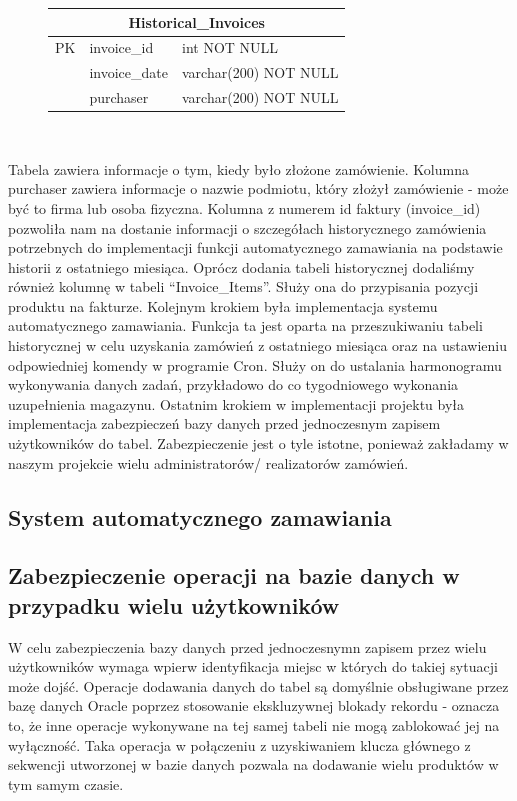 \documentclass{article}
\begin{document}
\begin{figure}[H]
   \centering
   \begin{tabular}{|c|l|l|} \hline
      \multicolumn{3}{|c|}{Historical\_Invoices} \\ \hline
      PK & invoice\_id   & int NOT NULL          \\ \hline
         & invoice\_date & varchar(200) NOT NULL \\
         & purchaser     & varchar(200) NOT NULL \\ \hline
   \end{tabular} \\
\end{figure}
\vspace{0.3cm}
Tabela zawiera informacje o tym, kiedy było złożone zamówienie.
Kolumna purchaser zawiera informacje o nazwie podmiotu, który złożył zamówienie
- może być to firma lub osoba fizyczna. Kolumna z numerem id faktury (invoice\_id) pozwoliła nam na
dostanie informacji o szczegółach historycznego zamówienia potrzebnych do implementacji funkcji
automatycznego zamawiania na podstawie historii z ostatniego miesiąca. Oprócz dodania tabeli
historycznej dodaliśmy również kolumnę w tabeli ``Invoice\_Items''. Służy ona do przypisania pozycji
produktu na fakturze. Kolejnym krokiem była implementacja systemu automatycznego zamawiania. Funkcja ta jest oparta na przeszukiwaniu tabeli
historycznej w celu uzyskania zamówień z ostatniego miesiąca oraz na ustawieniu odpowiedniej komendy
w programie Cron. Służy on do ustalania harmonogramu wykonywania danych zadań, przykładowo do
co tygodniowego wykonania uzupełnienia magazynu. Ostatnim krokiem w implementacji projektu była
implementacja zabezpieczeń bazy danych przed jednoczesnym zapisem użytkowników do tabel.
Zabezpieczenie jest o tyle istotne, ponieważ zakładamy w naszym projekcie wielu administratorów/
realizatorów zamówień.

\subsection{System automatycznego zamawiania}

\subsection{Zabezpieczenie operacji na bazie danych w przypadku wielu użytkowników}
W celu zabezpieczenia bazy danych przed jednoczesnymn zapisem przez wielu
użytkowników wymaga wpierw identyfikacja miejsc w których do takiej sytuacji
może dojść. Operacje dodawania danych do tabel są domyślnie obsługiwane przez
bazę danych Oracle poprzez stosowanie ekskluzywnej blokady rekordu - oznacza to,
że inne operacje wykonywane na tej samej tabeli nie mogą zablokować jej na
wyłączność. Taka operacja w połączeniu z uzyskiwaniem klucza głównego z
sekwencji utworzonej w bazie danych pozwala na dodawanie wielu produktów w tym
samym czasie.
\end{document}
